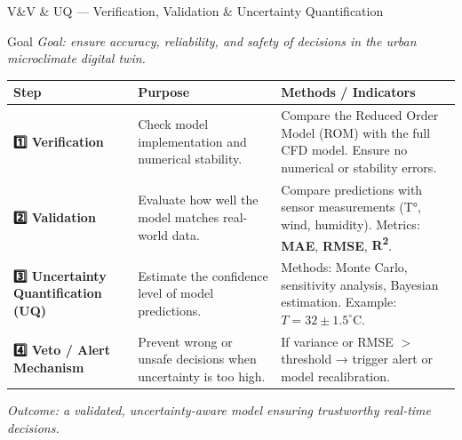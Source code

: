 \documentclass{beamer}
\begin{document}
\begin{frame}{V\&V \& UQ — Verification, Validation \& Uncertainty Quantification}
\centering
\tiny
\begin{block}{Goal}
    \textit{Goal: ensure accuracy, reliability, and safety of decisions in the urban microclimate digital twin.}
\end{block}
\vspace{0.4cm}
\begin{tabular}{|p{2.5cm}|p{3.5cm}|p{4.2cm}|}
\hline
\textbf{Step} & \textbf{Purpose} & \textbf{Methods / Indicators} \\
\hline
\textbf{1️⃣ Verification} &
Check model implementation and numerical stability. &
Compare the Reduced Order Model (ROM) with the full CFD model.  
Ensure no numerical or stability errors. \\
\hline
\textbf{2️⃣ Validation} &
Evaluate how well the model matches real-world data. &
Compare predictions with sensor measurements (T°, wind, humidity).  
Metrics: \textbf{MAE}, \textbf{RMSE}, \textbf{R\textsuperscript{2}}. \\
\hline
\textbf{3️⃣ Uncertainty Quantification (UQ)} &
Estimate the confidence level of model predictions. &
Methods: Monte Carlo, sensitivity analysis, Bayesian estimation.  
Example: $T = 32 \pm 1.5^\circ$C. \\
\hline
\textbf{4️⃣ Veto / Alert Mechanism} &
Prevent wrong or unsafe decisions when uncertainty is too high. &
If variance or RMSE $>$ threshold → trigger alert or model recalibration. \\
\hline
\end{tabular}

\vspace{0.3cm}
\textit{Outcome: a validated, uncertainty-aware model ensuring trustworthy real-time decisions.}
\end{frame}
\end{document}
